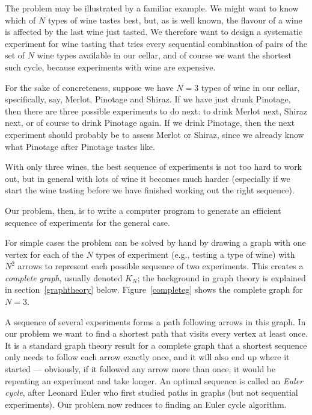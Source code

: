 \documentclass[12pt]{article}
\begin{document}
The problem may be illustrated by a familiar example. We might want to know which of $N$ types of wine tastes best, but, as is well known, the flavour of a wine is affected by the last wine just tasted. We therefore want to design a systematic experiment for wine tasting that tries every sequential combination of pairs of the set of $N$ wine types available in our cellar, and of course we want the shortest such cycle, because experiments with wine are expensive. 

For the sake of concreteness, suppose we have $N=3$ types of wine in our cellar, specifically, say, Merlot, Pinotage and Shiraz. If we have just drunk Pinotage, then there are three possible experiments to do next: to drink Merlot next, Shiraz next, or of course to drink Pinotage again. If we drink Pinotage, then the next experiment should probably be to assess Merlot or Shiraz, since we already know what Pinotage after Pinotage tastes like. 

With only three wines, the best sequence of experiments is not too hard to work out, but in general with lots of wine it becomes much harder (especially if we start the wine tasting before we have finished working out the right sequence).

Our problem, then, is to write a computer program to generate an efficient sequence of experiments for the general case. 

For simple cases the problem can be solved by hand by drawing a graph with one vertex for each of the $N$ types of experiment (e.g., testing a type of wine) with $N^2$ arrows to represent each possible sequence of two experiments. This creates a \emph{complete graph}, usually denoted $K_N$; the background in graph theory is explained in section~\ref{graphtheory} below. Figure~\ref{completeg} shows the complete graph for $N=3$.  

A sequence of several experiments forms a path following arrows in this graph. In our problem we want to find a shortest path that visits every vertex at least once. It is a standard graph theory result for a complete graph that a shortest sequence only needs to follow each arrow exactly once, and it will also end up where it started --- obviously, if it followed any arrow more than once, it would be repeating an experiment and take longer. An optimal sequence is called an \emph{Euler cycle}, after Leonard Euler who first studied paths in graphs (but not sequential experiments). Our problem now reduces to finding an Euler cycle algorithm. 
\end{document}
